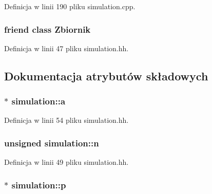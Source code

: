 Definicja w linii 190 pliku simulation.\-cpp.

\hypertarget{classsimulation_a444a8643309d19294860a4ae144137fe}{
\subsubsection[{Zbiornik}]{\setlength{\rightskip}{0pt plus 5cm}friend class {\bf Zbiornik}\hspace{0.3cm}{\ttfamily [friend]}}}\label{classsimulation_a444a8643309d19294860a4ae144137fe}


Definicja w linii 47 pliku simulation.\-hh.



\subsection{Dokumentacja atrybutów składowych}
\hypertarget{classsimulation_a7b5ca0e5fc096989be7966a73c360b7f}{
\subsubsection[{a}]{$\ast$ simulation\-::a\hspace{0.3cm}{\ttfamily [private]}}}\label{classsimulation_a7b5ca0e5fc096989be7966a73c360b7f}


Definicja w linii 54 pliku simulation.\-hh.

\hypertarget{classsimulation_a22eb97765a5c60adf3d995f7a110da70}{
\subsubsection[{n}]{\setlength{\rightskip}{0pt plus 5cm}unsigned simulation\-::n\hspace{0.3cm}{\ttfamily [private]}}}\label{classsimulation_a22eb97765a5c60adf3d995f7a110da70}


Definicja w linii 49 pliku simulation.\-hh.

\hypertarget{classsimulation_a5412fd01febe99f12ae38e30eb692ff0}{
\subsubsection[{p}]{$\ast$ simulation\-::p\hspace{0.3cm}{\ttfamily [private]}}}\label{classsimulation_a5412fd01febe99f12ae38e30eb692ff0}


